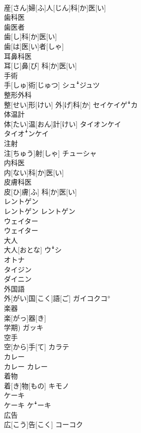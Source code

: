 \documentclass[8pt]{extreport}
\begin{document}
\begin{CJK}{UTF8}{min}
\\	産[さん]婦[ふ]人[じん]科[か]医[い]	
\\	歯科医 
\\	歯医者	
\\	歯[し]科[か]医[い] 
\\	歯[は]医[い]者[しゃ]	
\\	耳鼻科医	
\\	耳[じ]鼻[び] 科[か]医[い]	
\\	手術	
\\	手[しゅ]術[じゅつ]	シュꜜジュツ
\\	整形外科	
\\	整[せい]形[けい] 外[げ]科[か]	セイケイゲꜜカ
\\	体温計	
\\	体[たい]温[おん]計[けい]	タイオンケイ 
\\	タイオꜜンケイ
\\	注射	
\\	注[ちゅう]射[しゃ]	チューシャ
\\	内科医	
\\	内[ない]科[か]医[い]	
\\	皮膚科医	
\\	皮[ひ]膚[ふ] 科[か]医[い]	
\\	レントゲン	
\\	レントゲン	レントゲン
\\	ウェイター	
\\	ウェイター	
\\	大人	
\\	大人[おとな]	ウꜜシ 
\\	オトナ 
\\	タイジン 
\\	ダイニン
\\	外国語	
\\	外[がい]国[こく]語[ご]	ガイコクコ°
\\	楽器	
\\	楽[がっ]器[き] 
\\	学期)	ガッキ
\\	空手	
\\	空[から]手[て]	カラテ
\\	カレー	
\\	カレー	カレー
\\	着物	
\\	着[き]物[もの]	キモノ
\\	ケーキ	
\\	ケーキ	ケꜜーキ
\\	広告	
\\	広[こう]告[こく]	コーコク

\end{CJK}
\end{document}
